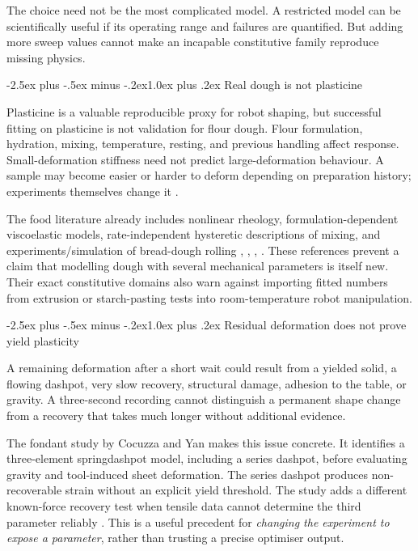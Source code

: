 \documentclass[
  11pt,
]{article}
\makeatletter
\renewcommand\subsection{\needspace{5\baselineskip}\@startsection{subsection}{2}{\z@}%
  {-2.5ex plus -.5ex minus -.2ex}{1.0ex plus .2ex}%
  {\normalfont\sffamily\large\bfseries\color{accent}}}
\makeatother
\begin{document}
The choice need not be the most complicated model. A restricted model
can be scientifically useful if its operating range and failures are
quantified. But adding more sweep values cannot make an incapable
constitutive family reproduce missing physics.

\subsection{Real dough is not
plasticine}\label{real-dough-is-not-plasticine}

Plasticine is a valuable reproducible proxy for robot shaping, but
successful fitting on plasticine is not validation for flour dough.
Flour formulation, hydration, mixing, temperature, resting, and previous
handling affect response. Small-deformation stiffness need not predict
large-deformation behaviour. A sample may become easier or harder to
deform depending on preparation history; experiments themselves change
it .

The food literature already includes nonlinear rheology,
formulation-dependent viscoelastic models, rate-independent hysteretic
descriptions of mixing, and experiments/simulation of bread-dough
rolling , ,
,
. These references prevent a claim
that modelling dough with several mechanical parameters is itself new.
Their exact constitutive domains also warn against importing fitted
numbers from extrusion or starch-pasting tests into room-temperature
robot manipulation.

\subsection{Residual deformation does not prove yield
plasticity}\label{residual-deformation-does-not-prove-yield-plasticity}

A remaining deformation after a short wait could result from a yielded
solid, a flowing dashpot, very slow recovery, structural damage,
adhesion to the table, or gravity. A three-second recording cannot
distinguish a permanent shape change from a recovery that takes much
longer without additional evidence.

The fondant study by Cocuzza and Yan makes this issue concrete. It
identifies a three-element spring\textendash{}\allowbreak{}dashpot
model, including a series dashpot, before evaluating gravity and
tool-induced sheet deformation. The series dashpot produces
non-recoverable strain without an explicit yield threshold. The study
adds a different known-force recovery test when tensile data cannot
determine the third parameter reliably
. This is a useful precedent for
\emph{changing the experiment to expose a parameter}, rather than
trusting a precise optimiser output.
\end{document}
